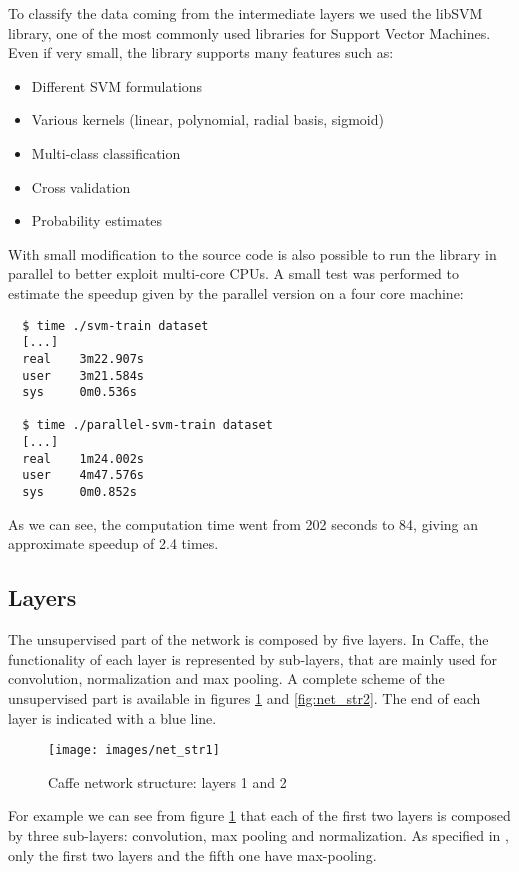 To classify the data coming from the intermediate layers we used the libSVM
library, one of the most commonly used libraries for Support Vector Machines.
Even if very small, the library supports many features such as:

\begin{itemize}\itemsep0.5pt
    \item Different SVM formulations
    \item Various kernels (linear, polynomial, radial basis, sigmoid)
    \item Multi-class classification
    \item Cross validation
    \item Probability estimates
\end{itemize}

With small modification to the source code is also possible to run the library
in parallel to better exploit multi-core CPUs. A small test was performed to
estimate the speedup given by the parallel version on a four core machine:

\begin{verbatim}
  $ time ./svm-train dataset
  [...]
  real    3m22.907s
  user    3m21.584s
  sys     0m0.536s

  $ time ./parallel-svm-train dataset
  [...]
  real    1m24.002s
  user    4m47.576s
  sys     0m0.852s
\end{verbatim}

As we can see, the computation time went from 202 seconds to 84, giving an
approximate speedup of 2.4 times.

\subsection{Layers}

The unsupervised part of the network is composed by five layers. In Caffe, the
functionality of each layer is represented by sub-layers, that are mainly used
for convolution, normalization and max pooling. A complete scheme of the
unsupervised part is available in figures \ref{fig:net_str1} and
\ref{fig:net_str2}. The end of each layer is indicated with a blue line. 

\begin{figure}[h!]\centering
    \texttt{[image: images/net\_str1]}
    \caption{Caffe network structure: layers 1 and 2}
    \label{fig:net_str1}
\end{figure}

For example we can see from figure \ref{fig:net_str1} that each of the first
two layers is composed by three sub-layers: convolution, max pooling and
normalization. As specified in \cite{NIPS2012_4824}, only the first two layers and the fifth
one have max-pooling. 


